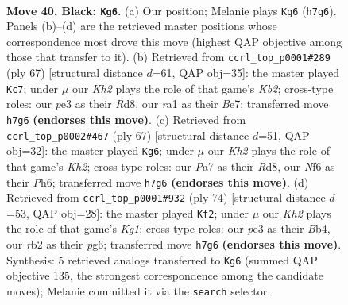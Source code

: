 \documentclass[11pt]{article}
\begin{document}
\clearpage

\begin{figure}[p]\centering
\begin{subfigure}{0.46\textwidth}\centering
\resizebox{\linewidth}{!}{%
\newchessgame
\chessboard[
  setfen={2r5/p5pk/P1bb1n1p/1p3p2/1P3P2/4P1P1/1R5K/RNB5 b - - 10 40},
  showmover=false,
  pgfstyle=straightmove, color=movearrow, markmove={h7-g6}
]}
\caption{}
\end{subfigure}\hfill
\begin{subfigure}{0.46\textwidth}\centering
\resizebox{\linewidth}{!}{%
\newchessgame
\chessboard[
  setfen={3r4/1k2bp2/2b1p1p1/p1p4p/2N1PP1P/6P1/1PP5/1K2RB2 b - - 5 34},
  showmover=false,
  pgfstyle=straightmove, color=movearrow, markmove={b7-c7}
]}
\caption{}
\end{subfigure}
\\[4pt]
\begin{subfigure}{0.46\textwidth}\centering
\resizebox{\linewidth}{!}{%
\newchessgame
\chessboard[
  setfen={3r4/3b2pk/pp1P3p/2pB2p1/P5P1/1P1R3P/5P2/6K1 b - - 0 34},
  showmover=false,
  pgfstyle=straightmove, color=movearrow, markmove={h7-g6}
]}
\caption{}
\end{subfigure}\hfill
\begin{subfigure}{0.46\textwidth}\centering
\resizebox{\linewidth}{!}{%
\newchessgame
\chessboard[
  setfen={1br5/pp3rkp/6p1/5p2/PB1P1P2/3BP3/6PP/1R4K1 w - - 0 38},
  showmover=false,
  pgfstyle=straightmove, color=movearrow, markmove={g1-f2}
]}
\caption{}
\end{subfigure}
\caption{\textbf{Move 40, Black: \texttt{Kg6}.} (a) Our position; Melanie plays \texttt{Kg6} (\texttt{h7g6}). Panels (b)--(d) are the retrieved master positions whose correspondence most drove this move (highest QAP objective among those that transfer to it). (b) Retrieved from \texttt{ccrl\_top\_p0001\#289} (ply 67) [structural distance $d$=61, QAP obj=35]: the master played \texttt{Kc7}; under $\mu$ our \emph{Kh2} plays the role of that game's \emph{Kb2}; cross-type roles: our \emph{p}e3 as their \emph{R}d8, our \emph{r}a1 as their \emph{B}e7; transferred move \texttt{h7g6} \textbf{(endorses this move)}. (c) Retrieved from \texttt{ccrl\_top\_p0002\#467} (ply 67) [structural distance $d$=51, QAP obj=32]: the master played \texttt{Kg6}; under $\mu$ our \emph{Kh2} plays the role of that game's \emph{Kh2}; cross-type roles: our \emph{P}a7 as their \emph{R}d8, our \emph{N}f6 as their \emph{P}h6; transferred move \texttt{h7g6} \textbf{(endorses this move)}. (d) Retrieved from \texttt{ccrl\_top\_p0001\#932} (ply 74) [structural distance $d$=53, QAP obj=28]: the master played \texttt{Kf2}; under $\mu$ our \emph{Kh2} plays the role of that game's \emph{Kg1}; cross-type roles: our \emph{p}e3 as their \emph{B}b4, our \emph{r}b2 as their \emph{p}g6; transferred move \texttt{h7g6} \textbf{(endorses this move)}. Synthesis: 5 retrieved analogs transferred to \texttt{Kg6} (summed QAP objective 135, the strongest correspondence among the candidate moves); Melanie committed it via the \texttt{search} selector.}
\label{fig:thought-m79}
\end{figure}
\end{document}
